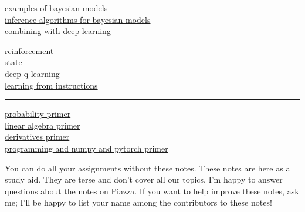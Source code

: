 \documentclass[11pt, justified]{tufte-book}
\begin{document}
{\begin{description}
\begin{description}
          \item[\hyperlink{D1}{examples of bayesian models}]
          \item[\hyperlink{D2}{inference algorithms for bayesian models}]
          \item[\hyperlink{D3}{combining with deep learning}]
        \end{description}
      \item[E. beyond learning-from-examples]                       \phdot  \hfill\pageref{part:E}
        \begin{description}
          \item[\hyperlink{E0}{reinforcement}]
          \item[\hyperlink{E1}{state}]
          \item[\hyperlink{E2}{deep q learning}]
          \item[\hyperlink{E3}{learning from instructions}]
        \end{description}
      \item[] \vspace{0.05cm} \hrule \vspace{-0.05cm}
      \item[F. appendices]                                          \phdot  \hfill\pageref{part:F}
        \begin{description}
          \item[\hyperlink{F0}{probability primer}]
          \item[\hyperlink{F1}{linear algebra primer}]
          \item[\hyperlink{F2}{derivatives primer}]
          \item[\hyperlink{F3}{programming and numpy and pytorch primer}]
        \end{description}
    \end{description}
  }
  You can do all your assignments without
  these notes.  These notes are here as a study aid.  They are terse and don't
  cover all our topics.  I'm happy to answer questions about the notes on
  Piazza.  If you want to help improve these notes, ask me; I'll be happy to
  list your name among the contributors to these notes!

  \newpage

    \label{part:A}
      \hypertarget{A2}{}
      
      \hypertarget{A2}{}
      
      \hypertarget{A2}{}
      
      \hypertarget{A2}{}
      
\end{document}
